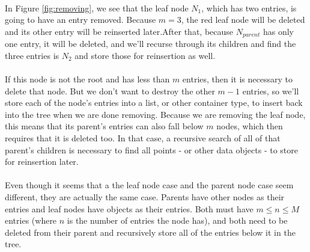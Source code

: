 \documentclass{article}
\begin{document}
\begin{multicols}{2}[]
\begin{minipage}{\linewidth}
\centering
{}
\label{fig:removing}
\end{minipage}

\paragraph{}
In Figure \ref{fig:removing}, we see that the leaf node $N_1$, which has two entries, is going to have an entry removed.
 Because $m=3$, the red leaf node will be deleted and its other entry will be reinserted later.After that, because $N_{parent}$
 has only one entry, it will be deleted, and we'll recurse through its children and find the three entries is $N_2$ and store those for reinsertion as well.
\paragraph{}
If this node is not the root and has less than $m$ entries, then it is necessary to delete that node. But we don't want to destroy
the other $m - 1$ entries, so we'll store each of the node's entries into a list, or other container type, to insert back into
the tree when we are done removing. Because we are removing the leaf node, this means that its parent's entries can also fall below
$m$ nodes, which then requires that it is deleted too. In that case, a recursive search of all of that parent's children is necessary
to find all points - or other data objects - to store for reinsertion later.
\paragraph{}
Even though it seems that a the leaf node case and the parent node case seem different, they are actually the same case. Parents have
other nodes as their entries and leaf nodes have objects as their entries. Both must have $m \le n \le M$ entries (where $n$ is the number
of entries the node has), and both need to be deleted from their parent and recursively store all of the entries below it in the tree.




\end{multicols}
\end{document}
